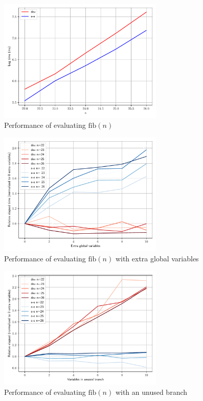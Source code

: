 \begin{figure}
  \centering
  \includegraphics[width=0.7\textwidth]{img/perf_fib.pdf}
  \caption{Performance of evaluating $\text{fib}(n)$}
  \label{fig:perf-fib}
\end{figure}

\begin{figure}
  \centering
  \includegraphics[width=0.7\textwidth]{img/perf_fib_more_vars.pdf}
  \caption{Performance of evaluating $\text{fib}(n)$ with extra global variables}
  \label{fig:perf-fib-more-vars}
\end{figure}

\begin{figure}
  \centering
  \includegraphics[width=0.7\textwidth]{img/perf_fib_more_branches.pdf}
  \caption{Performance of evaluating $\text{fib}(n)$ with an unused branch}
  \label{fig:perf-fib-more-branches}
\end{figure}


